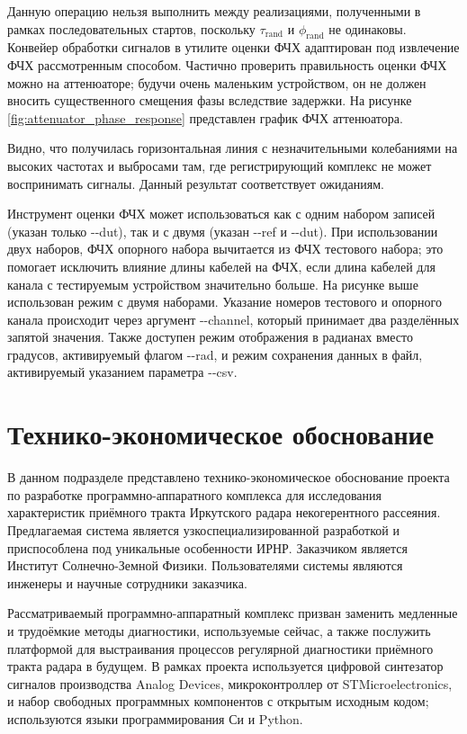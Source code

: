 \documentclass{report}
\begin{document}
Данную операцию нельзя выполнить между реализациями, полученными в рамках последовательных стартов, поскольку  $\tau_\text{rand}$ и $\phi_\text{rand}$ не одинаковы. Конвейер обработки сигналов в утилите оценки ФЧХ адаптирован под извлечение ФЧХ рассмотренным способом. Частично проверить правильность оценки ФЧХ можно на аттенюаторе; будучи очень маленьким устройством, он не должен вносить существенного смещения фазы вследствие задержки. На рисунке \ref{fig:attenuator_phase_response} представлен график ФЧХ аттенюатора.


Видно, что получилась горизонтальная линия с незначительными колебаниями на высоких частотах и выбросами там, где регистрирующий комплекс не может воспринимать сигналы. Данный результат соответствует ожиданиям.

Инструмент оценки ФЧХ может использоваться как с одним набором записей (указан только -{}-dut), так и с двумя (указан -{}-ref и -{}-dut). При использовании двух наборов, ФЧХ опорного набора вычитается из ФЧХ тестового набора; это помогает исключить влияние длины кабелей на ФЧХ, если длина кабелей для канала с тестируемым устройством значительно больше. На рисунке выше использован режим с двумя наборами. Указание номеров тестового и опорного канала происходит через аргумент -{}-channel, который принимает два разделённых запятой значения. Также доступен режим отображения в радианах вместо градусов, активируемый флагом -{}-rad, и режим сохранения данных в файл, активируемый указанием параметра -{}-csv.

\section{Технико-экономическое обоснование}

В данном подразделе представлено технико-экономическое обоснование проекта по разработке программно-аппаратного комплекса для исследования характеристик приёмного тракта Иркутского радара некогерентного рассеяния. Предлагаемая система является узкоспециализированной разработкой и приспособлена под уникальные особенности ИРНР. Заказчиком является Институт Солнечно-Земной Физики. Пользователями системы являются инженеры и научные сотрудники заказчика.

Рассматриваемый программно-аппаратный комплекс призван заменить медленные и трудоёмкие методы диагностики, используемые сейчас, а также послужить платформой для выстраивания процессов регулярной диагностики приёмного тракта радара в будущем. В рамках проекта используется цифровой синтезатор сигналов производства Analog Devices, микроконтроллер от STMicroelectronics, и набор свободных программных компонентов с открытым исходным кодом; используются языки программирования Си и Python.
\end{document}
